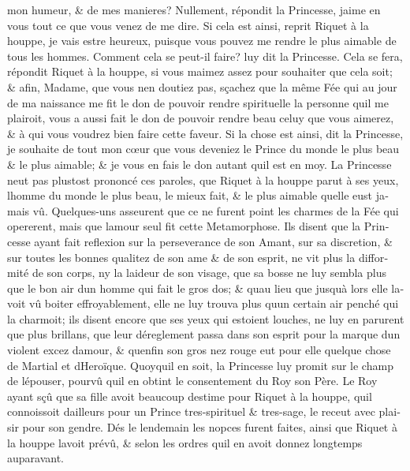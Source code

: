 \documentclass[14pt,a4paper]{memoir}
\begin{document}
\begin{otherlanguage}{french}
mon humeur, \& de mes manieres? Nullement, répondit la Princesse,
j\textquotesingle aime en vous tout ce que vous venez de me dire. Si
cela est ainsi, reprit Riquet à la houppe, je vais estre heureux,
puisque vous pouvez me rendre le plus aimable de tous les hommes.
Comment cela se peut-il faire? luy dit la Princesse. Cela se fera,
répondit Riquet à la houppe, si vous m\textquotesingle aimez assez pour
souhaiter que cela soit; \& afin, Madame, que vous n\textquotesingle en
doutiez pas, sçachez que la même Fée qui au jour de ma naissance me fit
le don de pouvoir rendre spirituelle la personne qu\textquotesingle il
me plairoit, vous a aussi fait le don de pouvoir rendre beau celuy que
vous aimerez, \& à qui vous voudrez bien faire cette faveur. Si la chose
est ainsi, dit la Princesse, je souhaite de tout mon cœur que vous
deveniez le Prince du monde le plus beau \& le plus aimable; \& je vous
en fais le don autant qu\textquotesingle il est en moy. La Princesse
n\textquotesingle eut pas plustost prononcé ces paroles, que Riquet à la
houppe parut à ses yeux, l\textquotesingle homme du monde le plus beau,
le mieux fait, \& le plus aimable quelle eust jamais vû. Quelques-uns
asseurent que ce ne furent point les charmes de la Fée qui opererent,
mais que l\textquotesingle amour seul fit cette Metamorphose. Ils disent
que la Princesse ayant fait reflexion sur la perseverance de son Amant,
sur sa discretion, \& sur toutes les bonnes qualitez de son ame \& de
son esprit, ne vit plus la difformité de son corps, ny la laideur de son
visage, que sa bosse ne luy sembla plus que le bon air
d\textquotesingle un homme qui fait le gros dos; \&
qu\textquotesingle au lieu que jusqu\textquotesingle à lors elle
l\textquotesingle avoit vû boiter effroyablement, elle ne luy trouva
plus qu\textquotesingle un certain air penché qui la charmoit; ils
disent encore que ses yeux qui estoient louches, ne luy en parurent que
plus brillans, que leur déreglement passa dans son esprit pour la marque
d\textquotesingle un violent excez d\textquotesingle amour, \&
qu\textquotesingle enfin son gros nez rouge eut pour elle quelque chose
de Martial et d\textquotesingle Heroïque. Quoyqu\textquotesingle il en
soit, la Princesse luy promit sur le champ de l\textquotesingle épouser,
pourvû qu\textquotesingle il en obtint le consentement du Roy son Père.
Le Roy ayant sçû que sa fille avoit beaucoup d\textquotesingle estime
pour Riquet à la houppe, qu\textquotesingle il connoissoit
d\textquotesingle ailleurs pour un Prince tres-spirituel \& tres-sage,
le receut avec plaisir pour son gendre. Dés le lendemain les nopces
furent faites, ainsi que Riquet à la houppe l\textquotesingle avoit
prévû, \& selon les ordres qu\textquotesingle il en avoit donnez
longtemps auparavant.


\end{otherlanguage}
\end{document}
